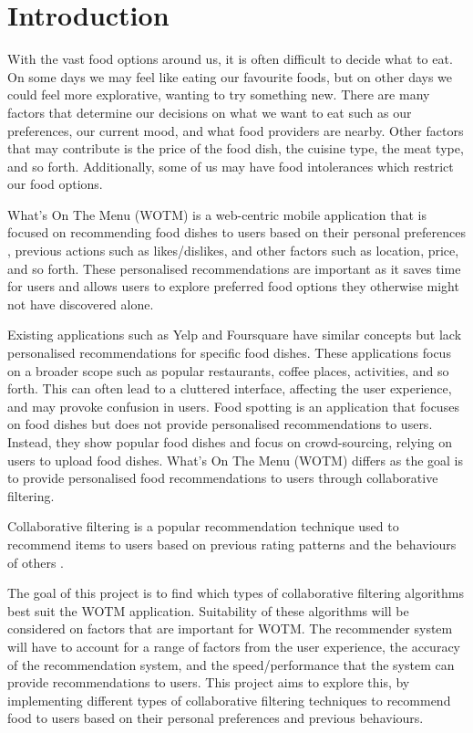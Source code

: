 \chapter{Introduction}\label{C:intro}

With the vast food options around us, it is often difficult to decide what to eat. On some days we may feel like eating our favourite foods, but on other days we could feel more explorative, wanting to try something new. There are many factors that determine our decisions on what we want to eat such as our preferences, our current mood, and what food providers are nearby. Other factors that may contribute is the price of the food dish, the cuisine type, the meat type, and so forth. Additionally, some of us may have food intolerances which restrict our food options.

What’s On The Menu (WOTM) is a web-centric mobile application that is focused on recommending food dishes to users based on their personal preferences , previous actions such as likes/dislikes, and other factors such as location, price, and so forth. These personalised recommendations are important as it saves time for users and allows users to explore preferred food options they otherwise might not have discovered alone. 

Existing applications such as Yelp and Foursquare have similar concepts but lack personalised recommendations for specific food dishes. These applications focus on a broader scope such as popular restaurants, coffee places, activities, and so forth. This can often lead to a cluttered interface, affecting the user experience, and may provoke confusion in users. Food spotting is an application that focuses on food dishes but does not provide personalised recommendations to users. Instead, they show popular food dishes and focus on crowd-sourcing, relying on users to upload food dishes. What's On The Menu (WOTM) differs as the goal is to provide personalised food recommendations to users through collaborative filtering. 

Collaborative filtering is a popular recommendation technique used to recommend items to users based on previous rating patterns and the behaviours of others \cite{itembased, schafer2007collaborative, survey}. 

The goal of this project is to find which types of collaborative filtering algorithms best suit the WOTM application. Suitability of these algorithms will be considered on factors that are important for WOTM. The recommender system will have to account for a range of factors from the user experience, the accuracy of the recommendation system, and the speed/performance that the system can provide recommendations to users. This project aims to explore this, by implementing different types of collaborative filtering techniques to recommend food to users based on their personal preferences and previous behaviours.

